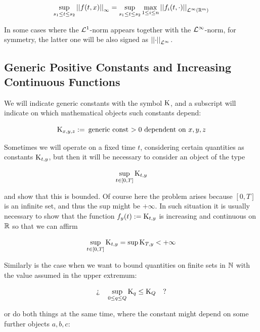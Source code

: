 \begin{equation*}
	\sup_{s_1 \leq t \leq s_2} \Normp{\infty}{f(t,x)} = \sup_{s_1 \leq t \leq s_2} \max_{1 \leq i \leq n} \Normp{\Lpspace^\infty(\R^m)}{f_i(t,\cdot)}
\end{equation*}

In some cases where the $\Lpspace^1$-norm appears together with the $\Lpspace^\infty$-norm, for symmetry, the latter one will be also signed as $\Normp{\Lpspace^\infty}{\cdot}$.


\subsection{Generic Positive Constants and Increasing Continuous Functions}

We will indicate generic constants with the symbol $\const$, and a subscript will indicate on which mathematical objects such constants depend:

\begin{equation*}
	\const_{x,y,z}:= \: \text{generic const $>0$ dependent on $x,y,z$}
\end{equation*}

Sometimes we will operate on a fixed time $t$, considering certain quantities as constants $\const_{t,y}$, but then it will be necessary to consider an object of the type

\begin{equation*}
	\sup_{t \in [0,T]} \const_{t,y}
\end{equation*}

and show that this is bounded.
Of course here the problem arises because $[0,T]$ is an infinite set, and thus the sup might be $+\infty$.
In such situation it is usually necessary to show that the function $f_y(t) := \const_{t,y} $ is increasing and continuous on $\R$ so that we can affirm

\begin{equation*}
		\sup_{t \in [0,T]} \const_{t,y} = \sup \const_{T,y} < +\infty
\end{equation*}

Similarly is the case when we want to bound quantities on finite sets in $\N$ with the value assumed in the upper extremum: 

\begin{equation*}
	\logQuest{
		\sup_{0\leq q \leq Q} \const_{q} \leq \const_Q 
	}
\end{equation*}

or do both things at the same time, where the constant might depend on some further objects $a,b,c$:

